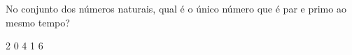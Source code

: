 No conjunto dos números naturais, qual é o único número que é par e primo ao mesmo tempo?

2
0
4
1
6




